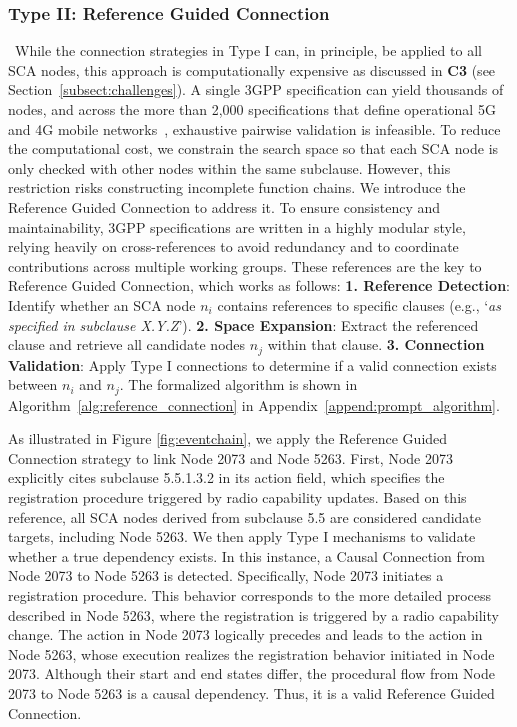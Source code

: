 \documentclass[sigconf]{acmart}
\begin{document}
{\subsubsection{Type II: Reference Guided Connection} 
~While the connection strategies in Type I can, in principle, be applied to all SCA nodes, this approach is computationally expensive as discussed in \textbf{C3} (see Section~\ref{subsect:challenges}).  
A single 3GPP specification can yield thousands of nodes, and across the more than 2,000 specifications that define operational 5G and 4G mobile networks~\cite{3gppspecs}, exhaustive pairwise validation is infeasible. 
To reduce the computational cost, we constrain the search space so that each SCA node is only checked with other nodes within the same subclause. However, this restriction risks constructing incomplete function chains. 
We introduce the Reference Guided Connection to address it. 
To ensure consistency and maintainability, 3GPP specifications are written in a highly modular style, relying heavily on cross-references to avoid redundancy and to coordinate contributions across multiple working groups. 
These references are the key to Reference Guided Connection, which works as follows: 
\noindent \textbf{1. Reference Detection}: Identify whether an SCA node \( n_i \) contains references to specific clauses (e.g., `\textit{as specified in subclause X.Y.Z}'). 
\textbf{2. Space Expansion}: Extract the referenced clause and retrieve all candidate nodes \( n_j \) within that clause. 
\textbf{3. Connection Validation}: Apply Type I connections to determine if a valid connection exists between \( n_i \) and \( n_j \).
The formalized algorithm is shown in Algorithm~\ref{alg:reference_connection} in Appendix~\ref{append:prompt_algorithm}.

As illustrated in Figure \ref{fig:eventchain}, we apply the Reference Guided Connection strategy to link Node 2073 and Node 5263. First, Node 2073 explicitly cites subclause 5.5.1.3.2 in its action field, which specifies the registration procedure triggered by radio capability updates. Based on this reference, all SCA nodes derived from subclause 5.5 are considered candidate targets, including Node 5263.
We then apply Type I mechanisms to validate whether a true dependency exists. In this instance, a Causal Connection from Node 2073 to Node 5263 is detected. Specifically, Node 2073 initiates a registration procedure. This behavior corresponds to the more detailed process described in Node 5263, where the registration is triggered by a radio capability change. The action in Node 2073 logically precedes and leads to the action in Node 5263, whose execution realizes the registration behavior initiated in Node 2073. Although their start and end states differ, the procedural flow from Node 2073 to Node 5263 is a causal dependency. Thus, it is a valid Reference Guided Connection.


}
\end{document}
